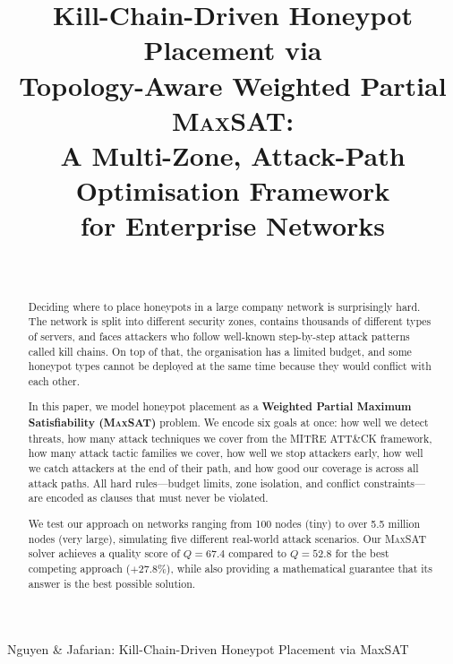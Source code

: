 \documentclass[journal]{IEEEtran}
\newcommand{\maxsat}{\textsc{MaxSAT}}
\begin{document}
\title{Kill-Chain-Driven Honeypot Placement via\\
       Topology-Aware Weighted Partial \textsc{MaxSAT}:\\
       A Multi-Zone, Attack-Path Optimisation Framework\\
       for Enterprise Networks}

\author{%
  \\
}

%
{Nguyen \& Jafarian: Kill-Chain-Driven Honeypot Placement via MaxSAT}

\maketitle

\begin{abstract}
Deciding where to place honeypots in a large company network
is surprisingly hard.
The network is split into different security zones, contains
thousands of different types of servers, and faces attackers
who follow well-known step-by-step attack patterns called
kill chains.
On top of that, the organisation has a limited budget, and
some honeypot types cannot be deployed at the same time
because they would conflict with each other.

In this paper, we model honeypot placement as a
\textbf{Weighted Partial Maximum Satisfiability (\maxsat{})}
problem.
We encode six goals at once: how well we detect threats,
how many attack techniques we cover from the MITRE ATT\&CK
framework, how many attack tactic families we cover, how well
we stop attackers early, how well we catch attackers at the
end of their path, and how good our coverage is across all
attack paths.
All hard rules---budget limits, zone isolation, and conflict
constraints---are encoded as clauses that must never be
violated.

We test our approach on networks ranging from 100 nodes
(tiny) to over 5.5 million nodes (very large), simulating
five different real-world attack scenarios.
Our \maxsat{} solver achieves a quality score of $Q=67.4$
compared to $Q=52.8$ for the best competing approach
($+27.8\%$), while also providing a mathematical guarantee
that its answer is the best possible solution.
\end{abstract}
\end{document}
